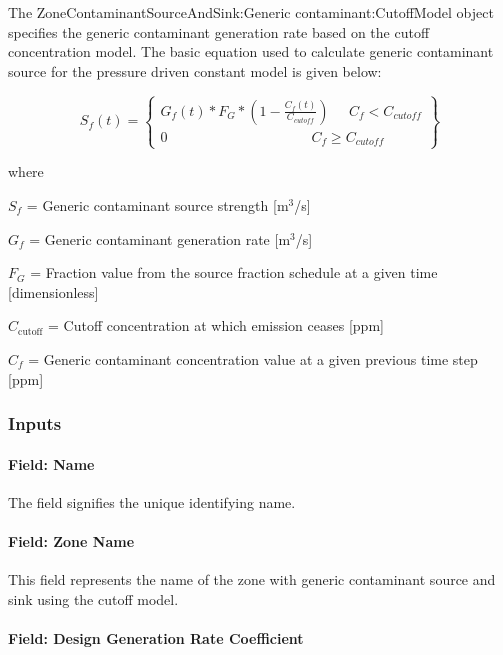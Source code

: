 The Zone\-Contaminant\-Source\-And\-Sink:\-Generic contaminant:CutoffModel object specifies the generic contaminant generation rate based on the cutoff concentration model. The basic equation used to calculate generic contaminant source for the pressure driven constant model is given below:

\begin{equation}
{S_f}(t) = \left\{ \begin{array}{l}{G_f}(t)*{F_G}*\left( {1 - \frac{{{C_f}(t)}}{{{C_{cutoff}}}}} \right)\;\;\;\;\;{C_f} < {C_{cutoff}}\\0\;\;\;\;\;\;\;\;\;\;\;\;\;\;\;\;\;\;\;\;\;\;\;\;\;\;\;\;\;\;\;\;\;\;\;\;\;{C_f} \ge {C_{cutoff}}\end{array} \right\}
\end{equation}

where

\(S_{f}\) = Generic contaminant source strength {[}m\(^{3}\)/s{]}

\(G_{f}\) = Generic contaminant generation rate {[}m\(^{3}\)/s{]}

\(F_{G}\) = Fraction value from the source fraction schedule at a given time {[}dimensionless{]}

\(C_{\mathrm{cutoff}}\) = Cutoff concentration at which emission ceases {[}ppm{]}

\(C_{f}\) = Generic contaminant concentration value at a given previous time step {[}ppm{]}

\subsubsection{Inputs}\label{inputs-13-006}

\paragraph{Field: Name}\label{field-name-13-005}

The field signifies the unique identifying name.

\paragraph{Field: Zone Name}\label{field-zone-name-4-002}

This field represents the name of the zone with generic contaminant source and sink using the cutoff model.

\paragraph{Field: Design Generation Rate Coefficient}\label{field-design-generation-rate-coefficient-1}

